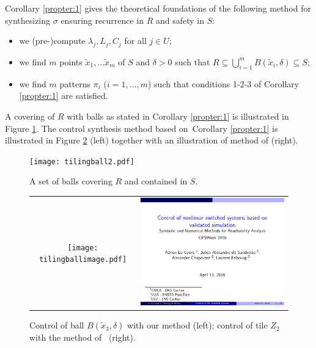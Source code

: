 Corollary \ref{propter:1} gives the theoretical foundations of the following method for synthesizing $\sigma$ ensuring recurrence in $R$ and safety in $S$:
\begin{itemize}
\item we (pre-)compute $\lambda_j, L_j, C_j$ for all $j\in U$;
\item we find $m$ points $\tilde{x}_1,\dots\tilde{x}_m$ of $S$
and $\delta>0$ such that $R\subseteq \bigcup_{i=1}^m B(\tilde{x}_i,\delta)\subseteq S$;
\item we find $m$ patterns $\pi_i$  ($i=1,...,m$)
such that conditions 1-2-3 of Corollary \ref{propter:1} are satisfied.
\end{itemize} 
%
A covering of $R$ with balls as stated in Corollary \ref{propter:1} is illustrated in Figure \ref{fig:tiling}.
The control synthesis method based on~Corollary \ref{propter:1}
is illustrated in Figure \ref{fig:post} (left)
together with an illustration of method of \cite{NL_minimator} (right).

\begin{figure}[h]
\centering
 \texttt{[image: tilingball2.pdf]}
\caption{A set of balls covering $R$ and contained in $S$.}
\label{fig:tiling}
\end{figure}




\begin{figure}[h]
\centering
\begin{tabular}{cc}
 \texttt{[image: tilingballimage.pdf]}
&
 \includegraphics[width=0.4\linewidth,clip,trim=1cm 0cm 1cm 0cm]{snr16.pdf}
\end{tabular}
\caption{Control of ball $B(\tilde x_3,\delta)$ with our method (left);  
control of tile $Z_2$ with the method of \cite{NL_minimator}~(right).}
\label{fig:post}
\end{figure}


